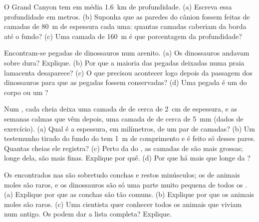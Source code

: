 \begin{exercise}[$\star\star$]\label{exo:g7:sediments-and-fossils:9}
O Grand Canyon tem em média \qty{1.6}{km} de profundidade. (a) Escreva
essa profundidade em metros. (b) Suponha que as paredes do cânion fossem
feitas de camadas de \qty{80}{m} de espessura cada uma: quantas camadas
caberiam da borda até o fundo? (c) Uma camada de \qty{160}{m} é que
porcentagem da profundidade?
\end{exercise}

\begin{exercise}[$\star\star$]\label{exo:g7:sediments-and-fossils:10}
Encontram-se pegadas de dinossauros num arenito. (a) Os dinossauros
andavam sobre  dura? Explique. (b) Por que a maioria das pegadas
deixadas numa praia lamacenta desaparece? (c) O que precisou acontecer
logo depois da passagem dos dinossauros para que as pegadas fossem
conservadas? (d) Uma pegada é um  do corpo ou um ?
\end{exercise}

\begin{exercise}[$\star\star\star$]\label{exo:g7:sediments-and-fossils:11}
Num , cada cheia deixa uma camada de  de cerca de \qty{2}{cm} de
espessura, e as semanas calmas que vêm depois, uma camada de  de
cerca de \qty{5}{mm} (dados de exercício). (a) Qual é a espessura, em
milímetros, de um par de camadas? (b) Um testemunho tirado do fundo do
 tem \qty{1}{m} de comprimento e é feito só desses pares. Quantas
cheias ele registra? (c) Perto da  do , as camadas de  são
mais grossas; longe dela, são mais finas. Explique por quê. (d) Por que
há mais  que  longe da ?
\end{exercise}

\begin{exercise}[$\star\star\star$]\label{exo:g7:sediments-and-fossils:12}
Os  encontrados nas  são sobretudo conchas e restos
minúsculos; os  de animais moles são raros, e os dinossauros são só
uma parte muito pequena de todos os . (a) Explique por que as
conchas são tão comuns. (b) Explique por que os animais moles são raros.
(c) Uma cientista quer conhecer todos os animais que viviam num 
antigo. Os  podem dar a lista completa? Explique.
\end{exercise}

